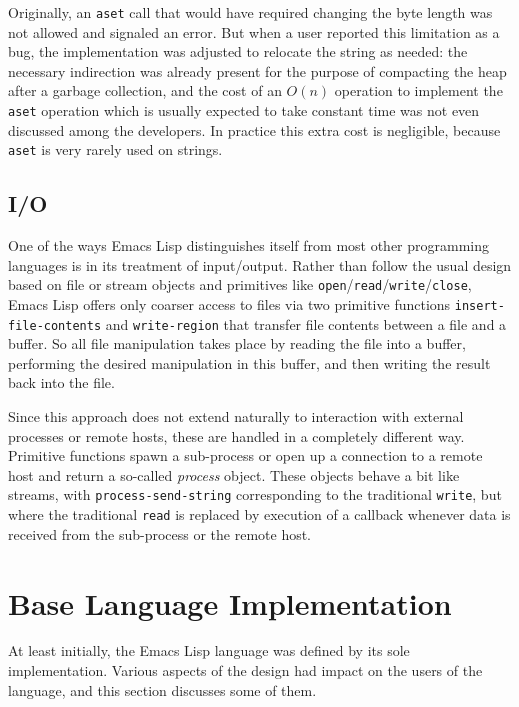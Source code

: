 \documentclass[format=acmsmall,screen]{acmart}
\newcommand \Elisp {Emacs Lisp}
\begin{document}
Originally, an \texttt{aset} call that would have required changing the
byte length was not allowed and signaled an error.  But when a user reported
this limitation as a bug, the implementation was adjusted to relocate the
string as needed: the necessary indirection was already present for the
purpose of compacting the heap after a garbage collection, and the cost of
an $O(n)$ operation to implement the \texttt{aset} operation which is
usually expected to take constant time was not even discussed among the
developers. In practice this extra cost is negligible, because
\texttt{aset} is very rarely used on strings.

\subsection{I/O}

One of the ways \Elisp{} distinguishes itself from most other programming
languages is in its treatment of input/output. Rather than follow the usual
design based on file or stream objects and primitives like
\texttt{open}/\texttt{read}/\texttt{write}/\texttt{close}, \Elisp{}
offers only coarser access to files via two primitive functions
\texttt{insert-file-contents} and \texttt{write-region} that transfer file
contents between a file and a buffer.  So all file manipulation takes place
by reading the file into a buffer, performing the desired manipulation in
this buffer, and then writing the result back into the file.

Since this approach does not extend naturally to interaction with external
processes or remote hosts, these are handled in a completely different way.
Primitive functions spawn a sub-process or open up
a connection to a remote host and return a so-called \emph{process} object.
These objects behave  a bit like streams, with \texttt{process-send-string}
corresponding to the traditional \texttt{write}, but where the traditional
\texttt{read} is replaced by execution of a callback whenever data is
received from the sub-process or the remote host.

\section{Base Language Implementation}
\label{sec:base-language-implementation}

At least initially, the \Elisp{} language was defined by its sole
implementation.  Various aspects of the design had impact on the users of the
language, and this section discusses some of them.
\end{document}
